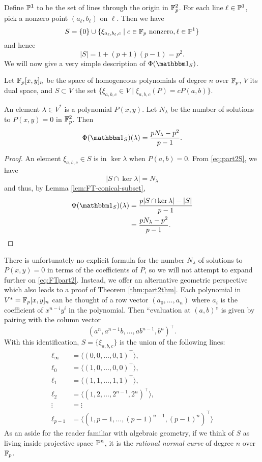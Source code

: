 Define $\P^1$ to be the set of lines through the origin in $\F_p^2$. For each line $\ell \in \P^1$, pick a nonzero point $(a_\ell,b_\ell)$ on $\ell$. Then we have
\begin{equation}\label{eq:part2S}
	S = \{0\} \cup \{\xi_{a_\ell,b_\ell,c} \mid c\in \F_p \text{ nonzero}, \ell \in \P^1 \}
\end{equation}
and hence
\[
	|S| = 1 + (p+1)(p-1) = p^2.
\]
We will now give a very simple description of $\Phi(\IND_S)$.
\begin{thm}\label{thm:part2thm}
	Let $\F_p[x,y]_n$ be the space of homogeneous polynomials of degree $n$ over $\F_p$, $V$ its dual space, and $S\subset V$ the set $\{\xi_{a,b,c} \in V \mid \xi_{a,b,c}(P) = cP(a,b)\}$.
	
	An element $\lambda \in V^*$ is a polynomial $P(x,y)$. Let $N_\lambda$ be the number of solutions to $P(x,y)=0$ in $\F_p^2$. Then
	\begin{equation}
		\Phi(\IND_S)(\lambda) = \frac{pN_\lambda - p^2}{p-1}.\label{eq:FTpart2}
	\end{equation}
\end{thm}
\begin{proof}
	An element $\xi_{a,b,c}\in S$ is in $\ker \lambda$ when $P(a,b) = 0$. From \eqref{eq:part2S}, we have
	\[
		|S \cap \ker \lambda| = N_\lambda
	\]
	and thus, by Lemma \ref{lem:FT-conical-subset},
	\begin{align*}
		\Phi (\IND_S) (\lambda) &= \frac{p|S\cap \ker \lambda| - |S|}{p-1}\\
		&= \frac{pN_\lambda - p^2}{p-1}.\qedhere
	\end{align*}
\end{proof}
There is unfortunately no explicit formula for the number $N_\lambda$ of solutions to $P(x,y) = 0$ in terms of the coefficients of $P$, so we will not attempt to expand further on \eqref{eq:FTpart2}. Instead, we offer an alternative geometric perspective which also leads to a proof of Theorem \ref{thm:part2thm}. Each polynomial in $V^* = \F_p[x,y]_n$ can be thought of a row vector $(a_0,\ldots,a_n)$ where $a_i$ is the coefficient of $x^{n-i}y^i$ in the polynomial. Then ``evaluation at $(a,b)$'' is given by pairing with the column vector
\[
	(a^n,a^{n-1}b,\ldots,ab^{n-1},b^n)^\top.
\]
With this identification, $S = \{\xi_{a,b,c}\}$ is the union of the following lines:
\begin{align*}
	\ell_\infty &= \langle (0,0,\ldots,0,1)^\top \rangle,\\
	\ell_0 &= \langle (1,0,\ldots,0,0)^\top \rangle,\\
	\ell_1 &= \langle (1,1,\ldots,1,1)^\top \rangle,\\
	\ell_2 &= \langle (1,2,\ldots,2^{n-1},2^n)^\top \rangle,\\
	\vdots &= \vdots\\
	\ell_{p-1} &= \langle (1,p-1,\ldots,(p-1)^{n-1},(p-1)^n)^\top \rangle
\end{align*}
As an aside for the reader familiar with algebraic geometry, if we think of $S$ as living inside projective space $\P^{n}$, it is the \emph{rational normal curve} of degree $n$ over $\F_p$.

